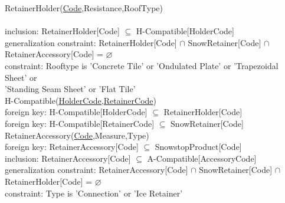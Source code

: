 {\color{ForestGreen}RetainerHolder(\underline{Code},Resistance,RoofType)}\\
{ \\
{\color{Orange}\hspace{2mm} inclusion: {\color{Magenta}RetainerHolder[Code] $\subseteq$ H-Compatible[HolderCode]}} \\
{\color{Orange}\hspace{2mm} generalization constraint: {\color{Magenta} RetainerHolder[Code] $\cap $ SnowRetainer[Code] $\cap$ RetainerAccessory[Code] = $\varnothing $}} \\
{\color{Orange}\hspace{2mm} constraint: {\color{Magenta}Rooftype is 'Concrete Tile' or 'Ondulated Plate' or 'Trapezoidal Sheet' or}} \\
{\color{Magenta}\hspace{19.5mm}'Standing Seam Sheet' or 'Flat Tile'}\\

{\color{ForestGreen}H-Compatible(\underline{HolderCode,RetainerCode})}\\
{\color{Orange}\hspace{2mm} foreign key: {\color{Magenta}H-Compatible[HolderCode] $\subseteq$ RetainerHolder[Code]}} \\
{\color{Orange}\hspace{2mm} foreign key: {\color{Magenta}H-Compatible[RetainerCode] $\subseteq$ SnowRetainer[Code]}} \\

{\color{ForestGreen}RetainerAccessory(\underline{Code},Measure,Type)}\\
{\color{Orange}\hspace{2mm} foreign key: {\color{Magenta}RetainerAccessory[Code] $\subseteq$ SnowstopProduct[Code]}} \\
{\color{Orange}\hspace{2mm} inclusion: {\color{Magenta}RetainerAccessory[Code] $\subseteq$ A-Compatible[AccessoryCode]}} \\
{\color{Orange}\hspace{2mm} generalization constraint: {\color{Magenta} RetainerAccessory[Code] $\cap $ SnowRetainer[Code] $\cap$ RetainerHolder[Code] = $\varnothing $}} \\
{\color{Orange}\hspace{2mm} constraint: {\color{Magenta}Type is 'Connection' or 'Ice Retainer'}} \\

}
